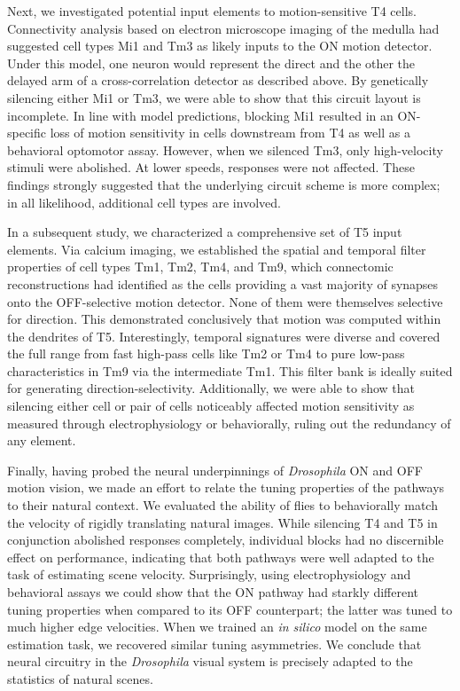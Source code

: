 Next, we investigated potential input elements to motion-sensitive T4 cells. Connectivity analysis based on electron microscope imaging of the medulla had suggested cell types Mi1 and Tm3 as likely inputs to the ON motion detector. Under this model, one neuron would represent the direct and the other the delayed arm of a cross-correlation detector as described above. By genetically silencing either Mi1 or Tm3, we were able to show that this circuit layout is incomplete. In line with model predictions, blocking Mi1 resulted in an ON-specific loss of motion sensitivity in cells downstream from T4 as well as a behavioral optomotor assay. However, when we silenced Tm3, only high-velocity stimuli were abolished. At lower speeds, responses were not affected. These findings strongly suggested that the underlying circuit scheme is more complex; in all likelihood, additional cell types are involved.

In a subsequent study, we characterized a comprehensive set of T5 input elements. Via calcium imaging, we established the spatial and temporal filter properties of cell types Tm1, Tm2, Tm4, and Tm9, which connectomic reconstructions had identified as the cells providing a vast majority of synapses onto the OFF-selective motion detector. None of them were themselves selective for direction. This demonstrated conclusively that motion was computed within the dendrites of T5. Interestingly, temporal signatures were diverse and covered the full range from fast high-pass cells like Tm2 or Tm4 to pure low-pass characteristics in Tm9 via the intermediate Tm1. This filter bank is ideally suited for generating direction-selectivity. Additionally, we were able to show that silencing either cell or pair of cells noticeably affected motion sensitivity as measured through electrophysiology or behaviorally, ruling out the redundancy of any element.

Finally, having probed the neural underpinnings of \textit{Drosophila} ON and OFF motion vision, we made an effort to relate the tuning properties of the pathways to their natural context. We evaluated the ability of flies to behaviorally match the velocity of rigidly translating natural images. While silencing T4 and T5 in conjunction abolished responses completely, individual blocks had no discernible effect on performance, indicating that both pathways were well adapted to the task of estimating scene velocity. Surprisingly, using electrophysiology and behavioral assays we could show that the ON pathway had starkly different tuning properties when compared to its OFF counterpart; the latter was tuned to much higher edge velocities. When we trained an \textit{in silico} model on the same estimation task, we recovered similar tuning asymmetries. We conclude that neural circuitry in the \textit{Drosophila} visual system is precisely adapted to the statistics of natural scenes.